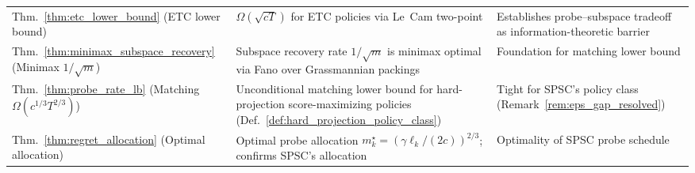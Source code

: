 \documentclass{article}
\begin{document}
{\begin{longtable}{
  >{\raggedright\arraybackslash}p{}
  >{\raggedright\arraybackslash}p{}
  >{\raggedright\arraybackslash}p{}
}
Thm.~\ref{thm:etc_lower_bound} \newline (ETC lower bound) &
  $\Omega(\sqrt{cT})$ for ETC policies via Le~Cam two-point &
  Establishes probe--subspace tradeoff as information-theoretic barrier \\

Thm.~\ref{thm:minimax_subspace_recovery} \newline (Minimax $1/\sqrt{m}$) &
  Subspace recovery rate $1/\sqrt{m}$ is minimax optimal via Fano over Grassmannian packings &
  Foundation for matching lower bound \\

Thm.~\ref{thm:probe_rate_lb} \newline (Matching $\Omega(c^{1/3}T^{2/3})$) &
  Unconditional matching lower bound for hard-projection score-maximizing policies (Def.~\ref{def:hard_projection_policy_class}) &
  Tight for SPSC's policy class (Remark~\ref{rem:eps_gap_resolved}) \\

Thm.~\ref{thm:regret_allocation} \newline (Optimal allocation) &
  Optimal probe allocation $m_k^\star = (\gamma\ell_k/(2c))^{2/3}$; confirms SPSC's allocation &
  Optimality of SPSC probe schedule \\

\end{longtable}
}%
\end{document}
